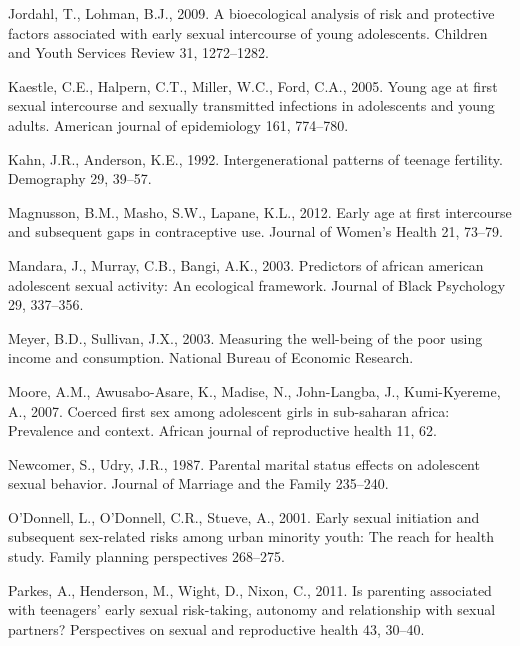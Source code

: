 \documentclass[
]{article}
\newlength{\cslhangindent}
\newenvironment{cslreferences}%
  {\setlength{\parindent}{0pt}%
  \everypar{\setlength{\hangindent}{\cslhangindent}}\ignorespaces}%
  {\par}
\begin{document}
\begin{cslreferences}
\leavevmode\hypertarget{ref-jordahl2009bioecological}{}%
Jordahl, T., Lohman, B.J., 2009. A bioecological analysis of risk and
protective factors associated with early sexual intercourse of young
adolescents. Children and Youth Services Review 31, 1272--1282.

\leavevmode\hypertarget{ref-kaestle2005young}{}%
Kaestle, C.E., Halpern, C.T., Miller, W.C., Ford, C.A., 2005. Young age
at first sexual intercourse and sexually transmitted infections in
adolescents and young adults. American journal of epidemiology 161,
774--780.

\leavevmode\hypertarget{ref-kahn1992intergenerational}{}%
Kahn, J.R., Anderson, K.E., 1992. Intergenerational patterns of teenage
fertility. Demography 29, 39--57.

\leavevmode\hypertarget{ref-magnusson2012early}{}%
Magnusson, B.M., Masho, S.W., Lapane, K.L., 2012. Early age at first
intercourse and subsequent gaps in contraceptive use. Journal of Women's
Health 21, 73--79.

\leavevmode\hypertarget{ref-mandara2003predictors}{}%
Mandara, J., Murray, C.B., Bangi, A.K., 2003. Predictors of african
american adolescent sexual activity: An ecological framework. Journal of
Black Psychology 29, 337--356.

\leavevmode\hypertarget{ref-meyer2003measuring}{}%
Meyer, B.D., Sullivan, J.X., 2003. Measuring the well-being of the poor
using income and consumption. National Bureau of Economic Research.

\leavevmode\hypertarget{ref-moore2007coerced}{}%
Moore, A.M., Awusabo-Asare, K., Madise, N., John-Langba, J.,
Kumi-Kyereme, A., 2007. Coerced first sex among adolescent girls in
sub-saharan africa: Prevalence and context. African journal of
reproductive health 11, 62.

\leavevmode\hypertarget{ref-newcomer1987parental}{}%
Newcomer, S., Udry, J.R., 1987. Parental marital status effects on
adolescent sexual behavior. Journal of Marriage and the Family 235--240.

\leavevmode\hypertarget{ref-o2001early}{}%
O'Donnell, L., O'Donnell, C.R., Stueve, A., 2001. Early sexual
initiation and subsequent sex-related risks among urban minority youth:
The reach for health study. Family planning perspectives 268--275.

\leavevmode\hypertarget{ref-parkes2011parenting}{}%
Parkes, A., Henderson, M., Wight, D., Nixon, C., 2011. Is parenting
associated with teenagers' early sexual risk-taking, autonomy and
relationship with sexual partners? Perspectives on sexual and
reproductive health 43, 30--40.


\end{cslreferences}
\end{document}
